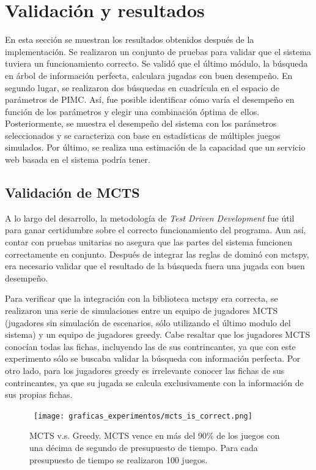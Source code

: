 \chapter{Validación y resultados}

\noindent
En esta sección se muestran los resultados obtenidos después de la
implementación. Se realizaron un conjunto de pruebas para validar que el sistema
tuviera un funcionamiento correcto. Se validó que el último módulo, la búsqueda
en árbol de información perfecta, calculara jugadas con buen desempeño. En
segundo lugar, se realizaron dos búsquedas en cuadrícula en el espacio de
parámetros de PIMC. Así, fue posible identificar cómo varía el desempeño en
función de los parámetros y elegir una combinación óptima de ellos.
Posteriormente, se muestra el desempeño del sistema con los parámetros
seleccionados y se caracteriza con base en estadísticas de múltiples juegos
simulados. Por último, se realiza una estimación de la capacidad que un servicio
web basada en el sistema podría tener.

\section{Validación de MCTS}

A lo largo del desarrollo, la metodología de  \textit{Test Driven Development}
fue útil para ganar certidumbre sobre el correcto funcionamiento del programa.
Aun así, contar con pruebas unitarias no asegura que las partes del sistema
funcionen correctamente en conjunto. Después de integrar las reglas de dominó
con mctspy, era necesario validar que el resultado de la búsqueda fuera una jugada
con buen desempeño.

Para verificar que la integración con la biblioteca mctspy era correcta, se
realizaron una serie de simulaciones entre un equipo de jugadores MCTS
(jugadores sin simulación de escenarios, sólo utilizando el último modulo del
sistema) y un equipo de jugadores greedy. Cabe resaltar que los jugadores MCTS
conocían todas las fichas, incluyendo las de sus contrincantes, ya que con este
experimento sólo se buscaba validar la búsqueda con información perfecta. Por
otro lado, para los jugadores greedy es irrelevante conocer las fichas de sus
contrincantes, ya que su jugada se calcula exclusivamente con la información de
sus propias fichas.

\begin{figure}[H]
    \begin{center}
        \hbox{\hspace{-2em}
        \texttt{[image: graficas\_experimentos/mcts\_is\_correct.png]}}
        \caption{MCTS v.s. Greedy. MCTS vence en más del 90\% de los juegos con
        una décima de segundo de presupuesto de tiempo. Para cada presupuesto de
        tiempo se realizaron 100 juegos.}
        \label{MGA}
    \end{center}
\end{figure}

